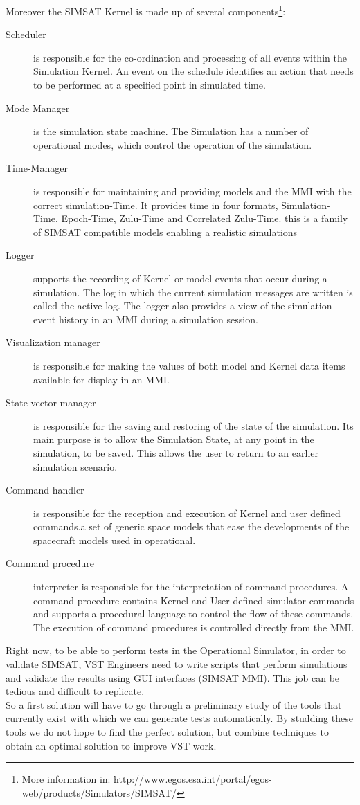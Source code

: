 Moreover the \ac{SIMSAT} Kernel is made up of several components\footnote{More information in: http://www.egos.esa.int/portal/egos-web/products/Simulators/SIMSAT/}:
\begin{description}
\item[Scheduler] is responsible for the co-ordination and processing of all events within the Simulation Kernel. An event on the schedule identifies an action that needs to be performed at a specified point in simulated time.
\item[Mode Manager] is the simulation state machine. The Simulation has a number of operational modes, which control the operation of the simulation.
\item[Time-Manager] is responsible for maintaining and providing models and the MMI with the correct simulation-Time. It provides time in four formats, Simulation-Time, Epoch-Time, Zulu-Time and Correlated Zulu-Time. this is a family of SIMSAT compatible models enabling a realistic simulations
\item[Logger] supports the recording of Kernel or model events that occur during a simulation. The log in which the current simulation messages are written is called the active log. The logger also provides a view of the simulation event history in an MMI during a simulation session.
\item[Visualization manager] is responsible for making the values of both model and Kernel data items available for display in an MMI.
\item[State-vector manager] is responsible for the saving and restoring of the state of the simulation. Its main purpose is to allow the Simulation State, at any point in the simulation, to be saved. This allows the user to return to an earlier simulation scenario.
\item[Command handler] is responsible for the reception and execution of Kernel and user defined commands.a set of generic space models that ease the developments of the spacecraft models used in operational.
\item[Command procedure] interpreter is responsible for the interpretation of command procedures. A command procedure contains Kernel and User defined simulator commands and supports a procedural language to control the flow of these commands. The execution of command procedures is controlled directly from the MMI.
\end{description}

Right now, to be able to perform tests in the Operational Simulator, in order to validate \ac{SIMSAT}, VST Engineers need to write scripts that
perform simulations and validate the results using GUI interfaces (\ac{SIMSAT} \ac{MMI}). This job can be tedious and difficult to replicate.\\
So a first solution will have to go through a preliminary study of the tools
that currently exist with which we can generate tests automatically.
By studding these tools we do not hope to find the perfect solution, but combine techniques to obtain an optimal solution to improve VST work.
